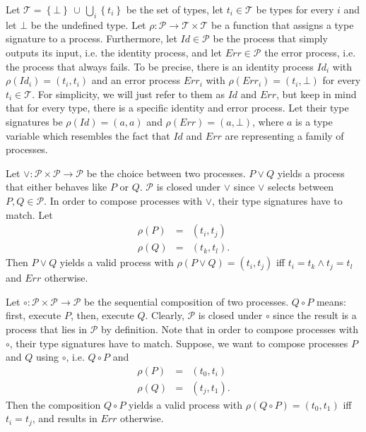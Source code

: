 Let $\mathcal{T} = \left\{ \bot \right\} \, \cup \, \bigcup_i \left\{ t_i \right\}$ be the set of types, let $t_i \in \mathcal{T}$ be types for every $i$ and let $\bot$ be the undefined type. Let $\rho \colon \mathcal{P} \to \mathcal{T} \times \mathcal{T}$ be a function that assigns a type signature to a process. Furthermore, let $Id \in \mathcal{P}$ be the process that simply outputs its input, i.e. the identity process, and let $Err \in \mathcal{P}$ the error process, i.e. the process that always fails. To be precise, there is an identity process $Id_i$ with $\rho \left( Id_i \right) = \left( t_i, t_i \right)$ and an error process $Err_i$ with $\rho \left( Err_i \right) = \left( t_i, \bot \right)$ for every $t_i \in \mathcal{T}$. For simplicity, we will just refer to them as $Id$ and $Err$, but keep in mind that for every type, there is a specific identity and error process. Let their type signatures be $\rho \left( Id \right) = \left( a, a \right)$ and $\rho \left( Err \right) = \left( a, \bot \right)$, where $a$ is a type variable which resembles the fact that $Id$ and $Err$ are representing a family of processes.

Let $\vee \colon \mathcal{P} \times \mathcal{P} \to \mathcal{P}$ be the choice between two processes. $P \vee Q$ yields a process that either behaves like $P$ or $Q$. $\mathcal{P}$ is closed under $\vee$ since $\vee$ selects between $P, Q \in \mathcal{P}$. In order to compose processes with $\vee$, their type signatures have to match. Let
\begin{eqnarray*}
  \rho \left( P \right) & = & \left( t_i, t_j \right) \\
  \rho \left( Q \right) & = & \left( t_k, t_l \right).
\end{eqnarray*}
Then $P \vee Q$ yields a valid process with $\rho \left( P \vee Q \right) = \left( t_i, t_j \right)$ iff $t_i = t_k \wedge t_j = t_l$ and $Err$ otherwise.

Let $\circ \colon \mathcal{P} \times \mathcal{P} \to \mathcal{P}$ be the sequential composition of two processes. $Q \circ P$ means: first, execute $P$, then, execute $Q$. Clearly, $\mathcal{P}$ is closed under $\circ$ since the result is a process that lies in $\mathcal{P}$ by definition. Note that in order to compose processes with $\circ$, their type signatures have to match. Suppose, we want to compose processes $P$ and $Q$ using $\circ$, i.e. $Q \circ P$ and
\begin{eqnarray*}
  \rho \left( P \right) & = & \left( t_0, t_i \right) \\
  \rho \left( Q \right) & = & \left( t_j, t_1 \right).
\end{eqnarray*}
Then the composition $Q \circ P$ yields a valid process with $\rho \left( Q \circ P \right) = \left( t_0, t_1 \right)$ iff $t_i = t_j$, and results in $Err$ otherwise. 

